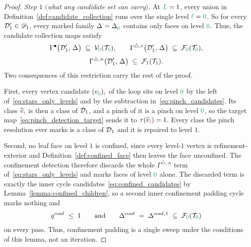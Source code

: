 \documentclass[a4paper, 12pt]{article}
\makeatletter
\newcommand{\collectV}{\Gamma^{\bullet}}                         %
\newcommand{\collectF}{\Gamma^{\triangle}}                       %
\newcommand{\targetlevel}{\tau}                                 %
\newcommand{\green}{\color{ForestGreen}}
\newcommand{\brickred}{\color{BrickRed}}
\newcommand{\T}{\mathcal{T}}
\newcommand{\V}{\mathcal{V}}
\newcommand{\F}{\mathcal{F}}
\DeclareRobustCommand{\simplexsubsetTwo}[2][]{\Delta\ifx\@empty#1\@empty\else^{#1}\fi_{#2}}
\newcommand{\vertex}[2]{\freeQ{v}{}{#1}{#2}}
\newcommand{\vertexClass}[1]{\widehat{v}_{#1}}
\newcommand{\coarseIdxone}{{\brickred i}}
\renewcommand{\l}{{\green\ell}}
\renewcommand{\L}{{\green L}}
\newcommand{\lzero}{{\green 0}}
\newcommand{\freeQ}[4]{ ( {#1}^{#2}_{#3} )_{#4}}
\theoremstyle{definition}
\theoremstyle{plain}
\numberwithin{equation}{section}
\DeclareRobustCommand{\domseq}[1][]{\mathcal{D}\ifx\@empty#1\@empty\else_{#1}\fi}
\newcommand{\alldomseqs}{\mathscr{D}}
\makeatother
\begin{document}
\begin{proof}
    \emph{Step $1$ $($what any candidate set can carry$)$.} At $\L = 1$, every union in Definition~\ref{def:candidate_collection} runs over the single level $\l = \lzero$. So for every $\domseq[1]' \in \alldomseqs_1$, every marked family $\simplexsubsetTwo{} = \simplexsubsetTwo[]{\lzero}$ contains only faces on level $\lzero$. Thus, the candidate collection maps satisfy
    \begin{equation}
        \label{eq:stars_only_levels}
        \begin{gathered}
            \collectV \big( \domseq[1]', \, \simplexsubsetTwo{} \big) \; \subseteq \; \V_\lzero(\T_\lzero) ,
            \qquad
            \collectF{}^{,c} \big( \domseq[1]', \, \simplexsubsetTwo{} \big) \; \subseteq \; \F_\lzero(\T_\lzero) , \\[3pt]
            \collectF{}^{,n} \big( \domseq[1]', \, \simplexsubsetTwo{} \big) \; \subseteq \; \F_1(\T_1) .
        \end{gathered}
    \end{equation}
    Two consequences of this restriction carry the rest of the proof.

    First, every vertex candidate $\vertex{\lzero}{\coarseIdxone}$ of the loop sits on level $\lzero$ by the left of~\eqref{eq:stars_only_levels} and by the subtraction in~\eqref{eq:pinch_candidates}. Its class $\vertexClass{\coarseIdxone}$ is then a class of $\domseq[1]$, and a pinch of it is a pinch on level $\lzero$, so the target map~\eqref{eq:pinch_detection_target} sends it to $\targetlevel(\vertexClass{\coarseIdxone}) = 1$. Every class the pinch resolution ever marks is a class of $\domseq[1]$ and it is repaired to level $1$.

    Second, no leaf face on level $1$ is confined, since every level-$1$ vertex is refinement-exterior and Definition~\ref{def:confined_face} then leaves the face unconfined. The confinement detection therefore discards the whole $\collectF{}^{,n}$ term of~\eqref{eq:stars_only_levels} and marks faces of level $\lzero$ alone. The discarded term is exactly the inner cycle candidates~\eqref{eq:confined_candidates} by Lemma~\ref{lemma:confined_children}, so a second inner confinement padding cycle marks nothing and
    \begin{equation}
        \label{eq:stars_only_one_cycle}
        q^{\mathrm{conf}} \; \leq \; 1
        \qquad \text{and} \qquad
        \simplexsubsetTwo[\mathrm{conf}]{} \; = \; \simplexsubsetTwo[\mathrm{conf},1]{} \; \subseteq \; \F_\lzero(\T_\lzero)
    \end{equation}
    on every pass. Thus, confinement padding is a single sweep under the conditions of this lemma, not an iteration.


\end{proof}
\end{document}

